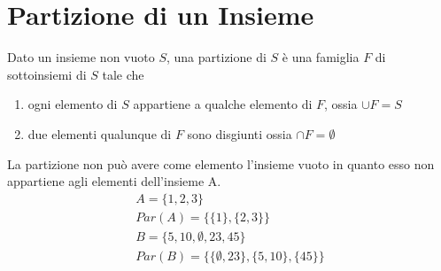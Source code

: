 \section{Partizione di un Insieme}
Dato un insieme non vuoto $S$, una partizione di $S$ è una famiglia $F$ di sottoinsiemi di $S$ tale che
\begin{enumerate}
    \item ogni elemento di $S$ appartiene a qualche elemento di $F$, ossia $\cup F = S$
    \item due elementi qualunque di $F$ sono disgiunti ossia $\cap F = \emptyset$
\end{enumerate}
La partizione non può avere come elemento l'insieme vuoto in quanto esso non
appartiene agli elementi dell'insieme A.
\begin{align*}
A = \{ 1,2,3 \}\\
Par(A) = \{ \{ 1 \},\{2,3 \} \}\\
B = \{5,10,\emptyset,23,45\}\\
Par(B) = \{ \{\emptyset,23\}, \{5,10\},\{45\}\} \\
\end{align*}
